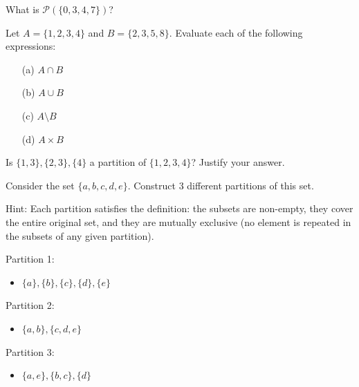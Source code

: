 \begin{exercise}
What is \(\mathcal{P}(\{0, 3, 4, 7\})\)?
\end{exercise}

\begin{exercise}
Let \( A = \{1, 2, 3, 4\} \) and \( B = \{2, 3, 5, 8\} \). Evaluate each of the following expressions:
\begin{enumerate}
    \item[(a)] \( A \cap B \)
    \item[(b)] \( A \cup B \)
    \item[(c)] \( A \setminus B \)
    \item[(d)] \( A \times B \)
\end{enumerate}
\end{exercise}

\begin{exercise}
     Is \(\{1, 3\}, \{2, 3\}, \{4\}\) a partition of \(\{1, 2, 3, 4\}\)? Justify your answer.
\end{exercise}

\begin{exercise}
    Consider the set \(\{a, b, c, d, e\}\). Construct 3 different partitions of this set.
\end{exercise}
Hint: Each partition satisfies the definition: the subsets are non-empty, they cover the entire original set, and they are mutually exclusive (no element is repeated in the subsets of any given partition).

Partition 1:
\begin{itemize}
    \item \(\{a\}, \{b\}, \{c\}, \{d\}, \{e\}\)
\end{itemize}

Partition 2:
\begin{itemize}
    \item \(\{a, b\}, \{c, d, e\}\)
\end{itemize}

Partition 3:
\begin{itemize}
    \item \(\{a, e\}, \{b, c\}, \{d\}\)
\end{itemize}

